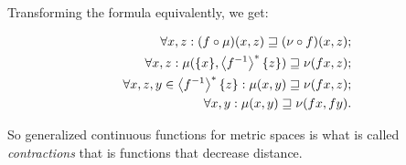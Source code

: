 Transforming the formula equivalently, we get:

\begin{align*}
\forall x,z: (f\circ\mu)(x,z)\sqsupseteq(\nu\circ f)(x,z);\\
\forall x,z: \mu(\{x\},\left\langle f^{-1}\right\rangle ^{\ast}\{z\})\sqsupseteq\nu(fx,z);\\
\forall x,z,y\in\left\langle f^{-1}\right\rangle ^{\ast}\{z\}: \mu(x,y)\sqsupseteq\nu(fx,z);\\
\forall x,y: \mu(x,y)\sqsupseteq\nu(fx,fy).
\end{align*}

So generalized continuous functions for metric spaces is what is called \emph{contractions} that is functions that decrease distance.
